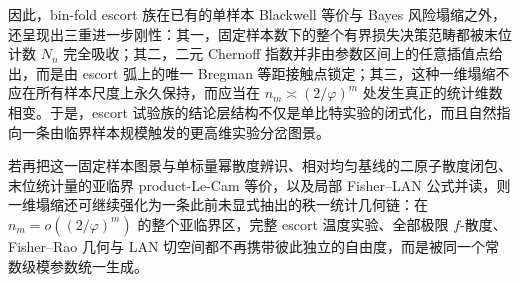 \noindent
因此，bin-fold escort 族在已有的单样本 Blackwell 等价与 Bayes 风险塌缩之外，还呈现出三重进一步刚性：其一，固定样本数下的整个有界损失决策范畴都被末位计数 \(N_n\) 完全吸收；其二，二元 Chernoff 指数并非由参数区间上的任意插值点给出，而是由 escort 弧上的唯一 Bregman 等距接触点锁定；其三，这种一维塌缩不应在所有样本尺度上永久保持，而应当在 \(n_m\asymp(2/\varphi)^m\) 处发生真正的统计维数相变。于是，escort 试验族的结论层结构不仅是单比特实验的闭式化，而且自然指向一条由临界样本规模触发的更高维实验分岔图景。

若再把这一固定样本图景与单标量幂散度辨识、相对均匀基线的二原子散度闭包、末位统计量的亚临界 product-Le-Cam 等价，以及局部 Fisher--LAN 公式并读，则一维塌缩还可继续强化为一条此前未显式抽出的秩一统计几何链：在 \(n_m=o((2/\varphi)^m)\) 的整个亚临界区，完整 escort 温度实验、全部极限 \(f\)-散度、Fisher--Rao 几何与 LAN 切空间都不再携带彼此独立的自由度，而是被同一个常数级模参数统一生成。



\endinput
